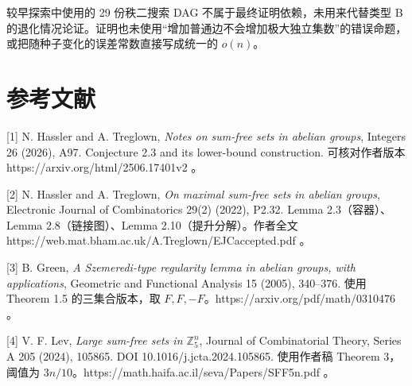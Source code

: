 \documentclass[11pt]{ctexart}
\begin{document}
较早探索中使用的 29 份秩二搜索 DAG 不属于最终证明依赖，未用来代替类型 B 的退化情况论证。证明也未使用“增加普通边不会增加极大独立集数”的错误命题，或把随种子变化的误差常数直接写成统一的 \(o(n)\)。

\section{参考文献}

[1] N. Hassler and A. Treglown, \emph{Notes on sum-free sets in abelian groups}, Integers 26 (2026), A97. Conjecture 2.3 and its lower-bound construction. 可核对作者版本 https://arxiv.org/html/2506.17401v2 。

[2] N. Hassler and A. Treglown, \emph{On maximal sum-free sets in abelian groups}, Electronic Journal of Combinatorics 29(2) (2022), P2.32. Lemma 2.3（容器）、Lemma 2.8（链接图）、Lemma 2.10（提升分解）。作者全文 https://web.mat.bham.ac.uk/A.Treglown/EJCaccepted.pdf 。

[3] B. Green, \emph{A Szemeredi-type regularity lemma in abelian groups, with applications}, Geometric and Functional Analysis 15 (2005), 340--376. 使用 Theorem 1.5 的三集合版本，取 \(F,F,-F\)。https://arxiv.org/pdf/math/0310476 。

[4] V. F. Lev, \emph{Large sum-free sets in \(\mathbb Z_5^n\)}, Journal of Combinatorial Theory, Series A 205 (2024), 105865. DOI 10.1016/j.jcta.2024.105865. 使用作者稿 Theorem 3，阈值为 \(3n/10\)。https://math.haifa.ac.il/seva/Papers/SFF5n.pdf 。
\end{document}
